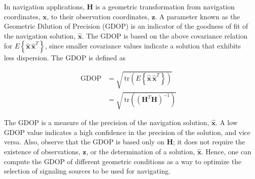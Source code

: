 In navigation applications, $\mathbf{H}$ is a geometric transformation from navigation
coordinates, $\mathbf{x}$, to their observation coordinates, $\mathbf{z}$. A parameter
known as the Geometric Dilution of Precision (GDOP) is an indicator of the goodness of
fit of the navigation solution, $\hat{\mathbf{x}}$. The GDOP is based on the above
covariance relation for $E \left\{ \hat{\mathbf{x}} \, \hat{\mathbf{x}}^T \right\}$,
since smaller covariance values indicate a solution that exhibits less dispersion. The
GDOP is defined as

\begin{equation*}
    \begin{aligned}
        \mathrm{GDOP} &= \sqrt{ \, \mathrm{tr} \left( E \left\{ \hat{\mathbf{x}} \, \hat{\mathbf{x}}^T \right\} \right) } \\
                      &= \sqrt{ \, \mathrm{tr} \left( \left( \mathbf{H}^T \mathbf{H} \right)^{-1} \right) }
    \end{aligned}
\end{equation*}

The GDOP is a measure of the precision of the navigation solution, $\hat{\mathbf{x}}$.
A low GDOP value indicates a high confidence in the precision of the solution, and vice
versa. Also, observe that the GDOP is based only on $\mathbf{H}$; it does not require
the existence of observations, $\mathbf{z}$, or the determination of a solution,
$\hat{\mathbf{x}}$. Hence, one can compute the GDOP of different geometric conditions
as a way to optimize the selection of signaling sources to be used for navigating.
